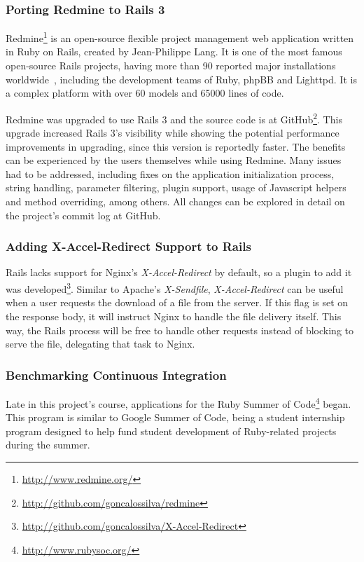 \subsubsection{Porting Redmine to Rails 3}
Redmine\footnote{\url{http://www.redmine.org/}} is an open-source flexible project management web application written in Ruby on Rails, created by Jean-Philippe Lang. It is one of the most famous open-source Rails projects, having more than 90 reported major installations worldwide~\cite{redmine_installations}, including the development teams of Ruby, phpBB and Lighttpd. It is a complex platform with over 60 models and 65000 lines of code.

Redmine was upgraded to use Rails 3 and the source code is at GitHub\footnote{\url{http://github.com/goncalossilva/redmine}}. This upgrade increased Rails 3's visibility while showing the potential performance improvements in upgrading, since this version is reportedly faster. The benefits can be experienced by the users themselves while using Redmine. Many issues had to be addressed, including fixes on the application initialization process, string handling, parameter filtering, plugin support, usage of Javascript helpers and method overriding, among others. All changes can be explored in detail on the project's commit log at GitHub.

\subsubsection{Adding X-Accel-Redirect Support to Rails}
Rails lacks support for Nginx's \textit{X-Accel-Redirect} by default, so a plugin to add it was developed\footnote{\url{http://github.com/goncalossilva/X-Accel-Redirect}}. Similar to Apache's \textit{X-Sendfile}, \textit{X-Accel-Redirect} can be useful when a user requests the download of a file from the server. If this flag is set on the response body, it will instruct Nginx to handle the file delivery itself. This way, the Rails process will be free to handle other requests instead of blocking to serve the file, delegating that task to Nginx.

\subsubsection{Benchmarking Continuous Integration}
Late in this project's course, applications for the Ruby Summer of Code\footnote{\url{http://www.rubysoc.org/}} began. This program is similar to Google Summer of Code, being a student internship program designed to help fund student development of Ruby-related projects during the summer.

